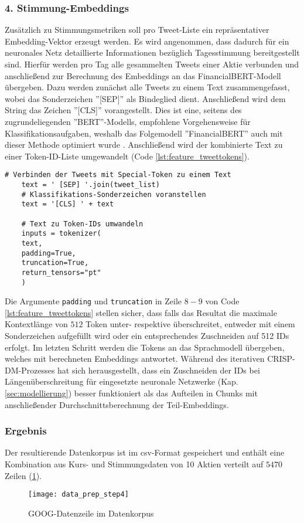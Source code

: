 \subsubsection*{4. Stimmung-Embeddings}
Zusätzlich zu Stimmungsmetriken soll pro Tweet-Liste ein repräsentativer Embedding-Vektor erzeugt werden. Es wird angenommen, dass dadurch für ein neuronales Netz detaillierte Informationen bezüglich Tagesstimmung bereitgestellt sind. Hierfür werden pro Tag alle gesammelten Tweets einer Aktie verbunden und anschließend zur Berechnung des Embeddings an das FinancialBERT-Modell übergeben.
Dazu werden zunächst alle Tweets zu einem Text zusammengefasst, wobei das Sonderzeichen ''[SEP]'' als Bindeglied dient. Anschließend wird dem String das Zeichen ''[CLS]'' vorangestellt. Dies ist eine, seitens des zugrundeliegenden ''BERT''-Modells, empfohlene Vorgehensweise für Klassifikationsaufgaben, weshalb das Folgemodell ''FinancialBERT'' auch mit dieser Methode optimiert wurde \autocite[Kap. 5.3]{hazourli2022financialbert}.
Anschließend wird der kombinierte Text zu einer Token-ID-Liste umgewandelt (Code \ref{lst:feature_tweettokens}). 
\begin{lstlisting}[caption={Umwandlung von Tweets zu Token-IDs}, label=lst:feature_tweettokens, captionpos=t]
	# Verbinden der Tweets mit Special-Token zu einem Text
	text = ' [SEP] '.join(tweet_list)
	# Klassifikations-Sonderzeichen voranstellen
	text = '[CLS] ' + text
	
	# Text zu Token-IDs umwandeln
	inputs = tokenizer(
	text, 
	padding=True, 
	truncation=True, 
	return_tensors="pt"
	)
\end{lstlisting}

Die Argumente \texttt{padding} und \texttt{truncation} in Zeile $8-9$ von Code \ref{lst:feature_tweettokens} stellen sicher, dass falls das Resultat die maximale Kontextlänge von $512$ Token unter- respektive überschreitet, entweder mit einem Sonderzeichen aufgefüllt wird oder ein entsprechendes Zuschneiden auf 512 IDs erfolgt.
Im letzten Schritt werden die Tokens an das Sprachmodell übergeben, welches mit berechneten Embeddings antwortet.
Während des iterativen \ac{CRISP-DM}-Prozesses hat sich herausgestellt, dass ein Zuschneiden der IDs bei Längenüberschreitung für eingesetzte neuronale Netzwerke (Kap. \ref{sec:modellierung}) besser funktioniert als das Aufteilen in Chunks mit anschließender Durchschnittsberechnung der Teil-Embeddings.

\subsubsection*{Ergebnis}
Der resultierende Datenkorpus ist im \ac{csv}-Format gespeichert und enthält eine Kombination aus Kurs- und Stimmungsdaten von 10 Aktien verteilt auf $5470$ Zeilen (\ref{fig:data_prep_step4}).
\begin{figure}[H]
	\texttt{[image: data\_prep\_step4]}
	\caption{GOOG-Datenzeile im Datenkorpus}
	\label{fig:data_prep_step4}
\end{figure}




